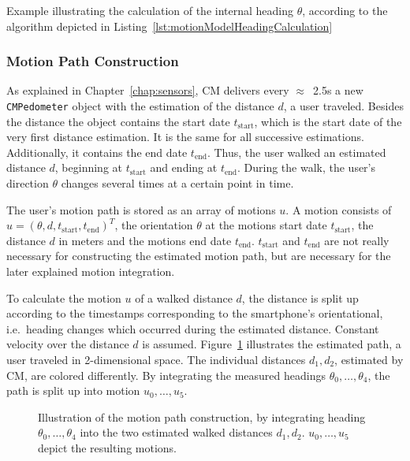 \begin{table}
	
	\caption{Example illustrating the calculation of the internal heading $\theta$, according to the algorithm depicted in Listing~\ref{lst:motionModelHeadingCalculation}}
	\label{tab:motionModelHeadingCalculationExample}
\end{table}

\subsubsection*{Motion Path Construction}
As explained in Chapter~\ref{chap:sensors}, \acs{CM} delivers every $\approx$~2.5s a new \texttt{CMPedometer} object with the estimation of the distance $d$, a user traveled. Besides the distance the object contains the start date $t_\text{start}$, which is the start date of the very first distance estimation. It is the same for all successive estimations. Additionally, it contains the end date $t_\text{end}$. Thus, the user walked an estimated distance $d$, beginning at $t_\text{start}$ and ending at $t_\text{end}$. During the walk, the user's direction $\theta$ changes several times at a certain point in time.

The user's motion path is stored as an array of motions $u$. A motion consists of $u = (\theta, d, t_\text{start}, t_\text{end})^T$, the orientation $\theta$ at the motions start date $t_\text{start}$, the distance $d$ in meters and the motions end date $t_\text{end}$. $t_\text{start}$ and $t_\text{end}$ are not really necessary for constructing the estimated motion path, but are necessary for the later explained motion integration.

To calculate the motion $u$ of a walked distance $d$, the distance is split up according to the timestamps corresponding to the smartphone's orientational, i.e.\ heading changes which occurred during the estimated distance. Constant velocity over the distance $d$ is assumed. Figure~\ref{fig:mm_path} illustrates the estimated path, a user traveled in 2-dimensional space. The individual distances $d_1, d_2$, estimated by \acs{CM}, are colored differently. By integrating the measured headings $\theta_0, \ldots, \theta_4$, the path is split up into motion $u_0, \ldots, u_5$.


\begin{figure}
	
	\caption{Illustration of the motion path construction, by integrating heading $\theta_0, \ldots, \theta_4$ into the two estimated walked distances $d_1, d_2$. $u_0, \ldots, u_5$ depict the resulting motions.}
	\label{fig:mm_path}
\end{figure}


